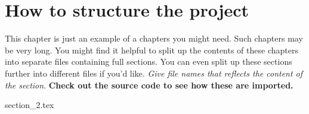 \chapter{How to structure the project}
\label{chp:example}
\begin{info}
	This chapter is just an example of a chapters you might need. Such chapters may be very long. You might find it helpful to split up the contents of these chapters into separate files containing full sections. You can even split up these sections further into different files if you'd like. \emph{Give file names that reflects the content of the section}. \textbf{Check out the source code to see how these are imported.}
\end{info}


{section_2.tex}

